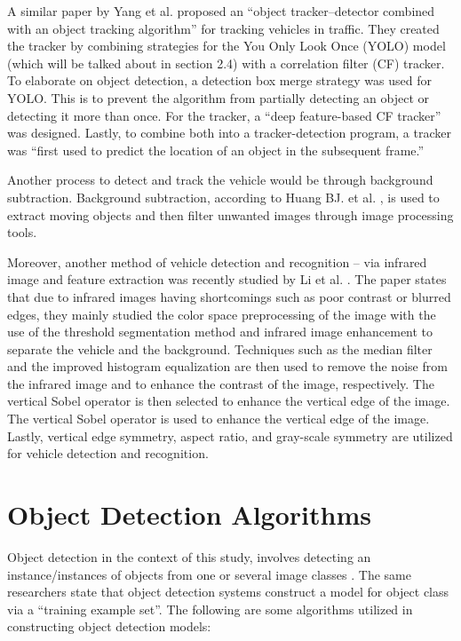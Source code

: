 	A similar paper by Yang et al. \citeyear{yang_2020} proposed an “object tracker–detector combined with an object tracking algorithm” for tracking vehicles in traffic. They created the tracker by combining strategies for the You Only Look Once (YOLO) model (which will be talked about in section 2.4) with a correlation filter (CF) tracker. To elaborate on object detection, a detection box merge strategy was used for YOLO. This is to prevent the algorithm from partially detecting an object or detecting it more than once. For the tracker, a “deep feature-based CF tracker” was designed. Lastly, to combine both into a tracker-detection program, a tracker was “first used to predict the location of an object in the subsequent frame.”

	Another process to detect and track the vehicle would be through background subtraction. Background subtraction, according to Huang BJ. et al. \citeyear{Huang_2017}, is used to extract moving objects and then filter unwanted images through image processing tools. 
	
	Moreover, another method of vehicle detection and recognition – via infrared image and feature extraction was recently studied by Li et al. \citeyear{li_2022}.
	The paper states that due to infrared images having shortcomings such as poor contrast or blurred edges, they mainly studied the color space preprocessing of the image with the use of the threshold segmentation method and infrared image enhancement to separate the vehicle and the background. Techniques such as the median filter and the improved histogram equalization are then used to remove the noise from the infrared image and to enhance the contrast of the image, respectively. The vertical Sobel operator is then selected to enhance the vertical edge of the image. The vertical Sobel operator is used to enhance the vertical edge of the image. Lastly, vertical edge symmetry, aspect ratio, and gray-scale symmetry are utilized for vehicle detection and recognition.


\section{Object Detection Algorithms}
Object detection in the context of this study, involves detecting an instance/instances of objects from one or several image classes \cite{Amit_Felzenszwalb_Girshick_2020}. The same researchers state that object detection systems construct a model for object class via a “training example set”. The following are some algorithms utilized in constructing object detection models:

